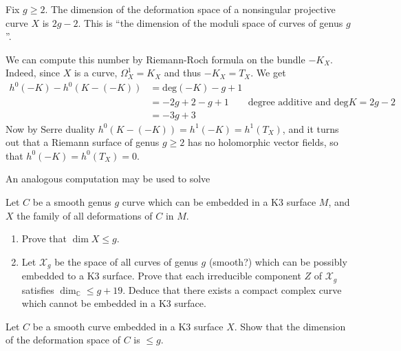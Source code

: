 \begin{example}
\label{example-moduli-space-of-nonsingular-Riemann-surfaces-of-genus-g}
\begin{reference}
\cite[Example 3.1]{continued-fractions}
\end{reference}
Fix $g \geq 2$. The dimension of the deformation space of a nonsingular
projective curve $X$ is $2g-2$. This is ``the dimension of the moduli space of
curves of genus $g$''.
 
We can compute this number by Riemann-Roch formula on the bundle $-K_X$. 
Indeed, since $X$ is a curve, $\Omega_X^1=K_X$ and thus $-K_X=T_X$. We get
\begin{align*}
h^0(-K)-h^0(K-(-K))&=\text{deg}(-K)-g+1\\
&=-2g+2-g+1\qquad \text{degree additive and $\text{deg}K=2g-2$}\\
&=-3g+3
\end{align*}
Now by Serre duality $h^0(K-(-K))=h^1(-K)=h^1(T_X)$, and it turns out that a
Riemann surface of genus $g \geq 2$ has no holomorphic vector fields, so that
$h^0(-K)=h^0(T_X)=0$.
\end{example}

An analogous computation may be used to solve

\begin{exercise}
\label{exercise-deformations-of-curves-in-K3}
Let $C$ be a smooth genus $g$ curve which can be embedded in a K3 surface  $M$,
and $X$ the family of all deformations of $C$ in $M$.
\begin{enumerate}
\item Prove that $\dim X \leq  g$.
\item Let $\mathcal{X}_g$ be the space of all curves of genus $g$ (smooth?)
which can be possibly embedded to a K3 surface. Prove that each irreducible
component $Z$ of $\mathcal{X}_g$ satisfies $\dim_\mathbb{C} \leq  g+19$. Deduce
that there exists a compact complex curve which cannot be embedded in a K3
surface.
\end{enumerate}
\end{exercise}

\begin{exercise}
\label{exercise-}
Let $C$ be a smooth curve embedded in a K3 surface $X$. Show that the dimension
of the deformation space of $C$ is $\leq g$.
\end{exercise}

